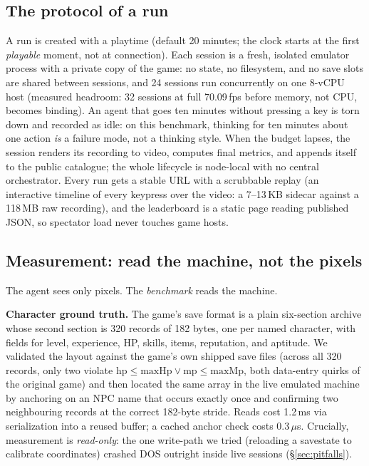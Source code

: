 \documentclass{article} %
\begin{document}
\subsection{The protocol of a run}

A run is created with a playtime (default 20 minutes; the clock starts at the first
\emph{playable} moment, not at connection). Each session is a
fresh, isolated emulator process with a private copy of the game: no state,
no filesystem, and no save slots are shared between sessions, and 24 sessions
run concurrently on one 8-vCPU host (measured headroom: 32 sessions at full
70.09\,fps before memory, not CPU, becomes binding). An agent that goes ten
minutes without pressing a key is torn down and recorded as idle: on this benchmark, thinking for ten minutes about one
action \emph{is} a failure mode, not a thinking style. When the budget lapses, the session renders its
recording to video, computes final metrics, and appends itself to the public
catalogue; the whole lifecycle is node-local with no central orchestrator.
Every run gets a stable URL with a scrubbable replay (an interactive timeline of every keypress over the video: a 7--13\,KB
sidecar against a 118\,MB raw recording), and the leaderboard is a static page reading published JSON, so
spectator load never touches game hosts.

\subsection{Measurement: read the machine, not the pixels}
\label{sec:measure}

The agent sees only pixels. The \emph{benchmark} reads the machine.

\textbf{Character ground truth.} The game's save format is a plain
six-section archive whose second section is 320 records of 182 bytes, one per named
character, with fields for level, experience, HP, skills, items,
reputation, and aptitude. We validated the layout against the game's own
shipped save files (across all 320 records, only two violate
$\mathrm{hp}\le\mathrm{maxHp} \lor \mathrm{mp}\le\mathrm{maxMp}$, both
data-entry quirks of the original game) and then located the same array in
the live emulated machine by anchoring on an NPC name that occurs exactly
once and confirming two neighbouring records at the correct 182-byte stride.
Reads cost 1.2\,ms via serialization into a reused buffer; a cached anchor
check costs 0.3\,$\mu$s. Crucially, measurement is \emph{read-only}: the one
write-path we tried (reloading a savestate to calibrate coordinates) crashed
DOS outright inside live sessions (\S\ref{sec:pitfalls}).
\end{document}
